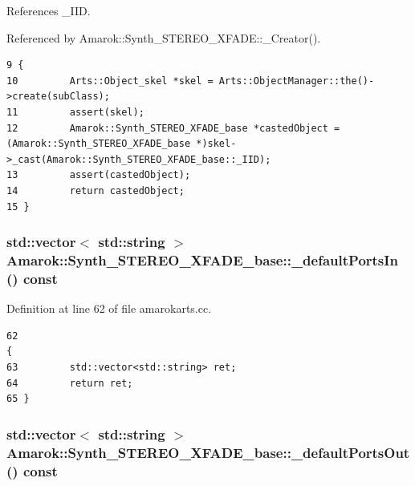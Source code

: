 References \_\-IID.

Referenced by Amarok::Synth\_\-STEREO\_\-XFADE::\_\-Creator().



\footnotesize\begin{verbatim}9 {
10         Arts::Object_skel *skel = Arts::ObjectManager::the()->create(subClass);
11         assert(skel);
12         Amarok::Synth_STEREO_XFADE_base *castedObject = (Amarok::Synth_STEREO_XFADE_base *)skel->_cast(Amarok::Synth_STEREO_XFADE_base::_IID);
13         assert(castedObject);
14         return castedObject;
15 }
\end{verbatim}\normalsize 
{}
\subsubsection{\setlength{\rightskip}{0pt plus 5cm}std::vector$<$ std::string $>$ Amarok::Synth\_\-STEREO\_\-XFADE\_\-base::\_\-default\-Ports\-In () const\hspace{0.3cm}{\tt  [virtual]}}\label{classAmarok_1_1Synth__STEREO__XFADE__base_Amarok_1_1Synth__STEREO__XFADE__stuba4}




Definition at line 62 of file amarokarts.cc.



\footnotesize\begin{verbatim}62                                                                           {
63         std::vector<std::string> ret;
64         return ret;
65 }
\end{verbatim}\normalsize 
{}
\subsubsection{\setlength{\rightskip}{0pt plus 5cm}std::vector$<$ std::string $>$ Amarok::Synth\_\-STEREO\_\-XFADE\_\-base::\_\-default\-Ports\-Out () const\hspace{0.3cm}{\tt  [virtual]}}\label{classAmarok_1_1Synth__STEREO__XFADE__base_Amarok_1_1Synth__STEREO__XFADE__stuba5}




